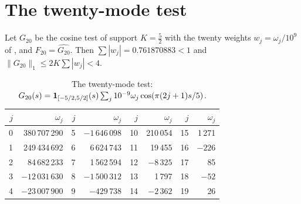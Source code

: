 \documentclass[11pt,colorlinks]{charlie}
\begin{document}
\section{The twenty-mode test}\label{sec:tests}
Let $G_{20}$ be the cosine test of support $K=\frac52$ with the twenty weights $w_j=\omega_j/10^9$ of , and $F_{20}=\widehat{G_{20}}$. Then $\sum|w_j|=0.761870883<1$ and $\|G_{20}\|_1\le2K\sum|w_j|<4$.
\begin{table}[ht]
\centering\small
\begin{tabular}{@{}rr@{\qquad}rr@{\qquad}rr@{\qquad}rr@{}}
\toprule
$j$ & $\omega_j$ & $j$ & $\omega_j$ & $j$ & $\omega_j$ & $j$ & $\omega_j$\\
\midrule
0 & 380\,707\,290 & 5 & $-1\,646\,098$ & 10 & 210\,054 & 15 & 1\,271\\
1 & 249\,434\,692 & 6 & 6\,624\,743 & 11 & 19\,455 & 16 & $-226$\\
2 & 84\,682\,233 & 7 & 1\,562\,594 & 12 & $-8\,325$ & 17 & 85\\
3 & $-12\,031\,630$ & 8 & $-1\,500\,312$ & 13 & 1\,797 & 18 & $-52$\\
4 & $-23\,007\,900$ & 9 & $-429\,738$ & 14 & $-2\,362$ & 19 & 26\\
\bottomrule
\end{tabular}
\caption{The twenty-mode test: $G_{20}(s)=\mathbf{1}_{[-5/2,5/2]}(s)\sum_j10^{-9}\omega_j\cos(\pi(2j+1)s/5)$.}\label{tab:twenty}
\end{table}
\end{document}

